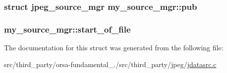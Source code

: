 \subsubsection[{pub}]{\setlength{\rightskip}{0pt plus 5cm}struct {\bf jpeg\+\_\+source\+\_\+mgr} my\+\_\+source\+\_\+mgr\+::pub}\label{structmy__source__mgr_a8572f33f87bec948592001edea12680f}
\hypertarget{structmy__source__mgr_a5c505c9008db53bb3ce07ed8ae3872a9}{}
\subsubsection[{start\+\_\+of\+\_\+file}]{ my\+\_\+source\+\_\+mgr\+::start\+\_\+of\+\_\+file}\label{structmy__source__mgr_a5c505c9008db53bb3ce07ed8ae3872a9}


The documentation for this struct was generated from the following file\+:\begin{DoxyCompactItemize}
\item 
src/third\+\_\+party/orsa-\/fundamental\+\_./src/third\+\_\+party/jpeg/\hyperlink{jdatasrc_8c}{jdatasrc.\+c}\end{DoxyCompactItemize}
